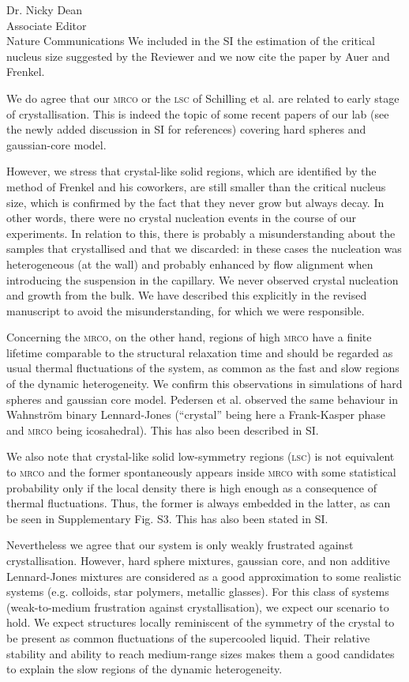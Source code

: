 \documentclass[a4paper, rebuttal, parskip=true, firsthead=false, fromemail=true, foldmarks=false]{scrlttr2}
\begin{document}
\begin{letter}{Dr. Nicky Dean\\
Associate Editor\\
Nature Communications}
We included in the SI the estimation of the critical nucleus size suggested by the Reviewer and we now cite the paper by Auer and Frenkel.

We do agree that our \textsc{mrco} or the \textsc{lsc} of Schilling et al. are related to early stage of crystallisation. This is indeed the topic of some recent papers of our lab (see the newly added discussion in SI for references) covering hard spheres and gaussian-core model. 

However, we stress that crystal-like solid regions, which are identified by the method of Frenkel and his coworkers, are still smaller than the critical nucleus size, which is confirmed by the fact that they never grow but always decay. In other words, there were no crystal nucleation events in the course of our experiments. In relation to this, there is probably a misunderstanding about the samples that crystallised and that we discarded: in these cases the nucleation was heterogeneous (at the wall) and probably enhanced by flow alignment when introducing the suspension in the capillary. We never observed crystal nucleation and growth from the bulk. We have described this explicitly in the revised manuscript to avoid the misunderstanding, for which we were responsible. 

Concerning the \textsc{mrco}, on the other hand, regions of high \textsc{mrco} have a finite lifetime comparable to the structural relaxation time and should be regarded as  usual thermal fluctuations of the system, as common as the fast and slow regions of the dynamic heterogeneity. We confirm this observations in simulations of hard spheres and gaussian core model. Pedersen et al. observed the same behaviour in Wahnstr\"om binary Lennard-Jones (``crystal'' being here a Frank-Kasper phase and \textsc{mrco} being icosahedral). This has also been described in SI. 

We also note that crystal-like solid low-symmetry regions (\textsc{lsc}) is not equivalent to \textsc{mrco} and the former spontaneously appears inside \textsc{mrco} with some statistical probability only if the local density there is high enough as a consequence of thermal fluctuations. Thus, the former is always embedded in the latter, as can be seen in Supplementary Fig. S3. This has also been stated in SI.

Nevertheless we agree that our system is only weakly frustrated against crystallisation. However, hard sphere mixtures, gaussian core, and non additive Lennard-Jones mixtures are considered as a good approximation to some realistic systems (e.g. colloids, star polymers, metallic glasses). For this class of systems (weak-to-medium frustration against crystallisation), we expect our scenario to hold. We expect structures locally reminiscent of the symmetry of the crystal to be present as common fluctuations of the supercooled liquid. Their relative stability and ability to reach medium-range sizes makes them a good candidates to explain the slow regions of the dynamic heterogeneity.


\end{letter}
\end{document}
